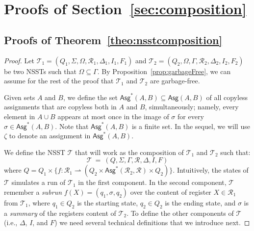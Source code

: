 \documentclass[
a4paper
]{article}
\theoremstyle{plain}
\theoremstyle{definition}
\theoremstyle{remark}
\newcommand{\pmap}{\rightharpoonup}
\newcommand{\Reg}{\mathcal{R}}
\newcommand{\Asg}{\operatorname{Asg}}
\newcommand{\Asgs}{\operatorname{Asg}^*}
\newcommand{\nsst}{\mathcal{T}}
\renewcommand{\operatorname}[1]{\textsf{#1}}
\begin{document}
\section{Proofs of Section~\ref{sec:composition}}\label{sec:compAppendix}
	
\subsection{Proofs of Theorem~\ref{theo:nsstcomposition}}

\begin{proof}
Let $\nsst_1 = (Q_1, \Sigma, \Omega, \Reg_1, \Delta_1, I_1, F_1)$ and $\nsst_2 = (Q_2, \Omega, \Gamma, \Reg_2, \Delta_2, I_2, F_2)$ be two NSSTs such that $\Omega \subseteq \Gamma$. By Proposition~\ref{prop:garbageFree}, we can assume for the rest of the proof that $\nsst_1$ and $\nsst_2$ are garbage-free. 

Given sets $A$ and $B$, we define the set $\Asgs(A, B) \subseteq \Asg(A,B)$ of all copyless assignments that are copyless both in $A$ and $B$, simultaneously; namely, every element in $A \cup B$ appears at most once in the image of $\sigma$ for every $\sigma \in \Asgs(A,B)$. Note that $\Asgs(A, B)$ is a finite set. In the sequel, we will use $\zeta$ to denote an assignment in $\Asgs(A,B)$.

We define the NSST $\nsst$ that will work as the composition of $\nsst_1$ and $\nsst_2$ such that:
\[
\nsst \ = \ (Q, \Sigma, \Gamma, \Reg, \Delta, I, F)
\]
where $Q = Q_1 \times \{f\colon \Reg_1 \pmap (Q_2 \times \Asgs(\Reg_2, \Reg) \times Q_2) \}$. Intuitively, the states of $\nsst$ simulates a run of $\nsst_1$ in the first component. In the second component, $\nsst$ remember a \emph{subrun} $f(X) = (q_1, \sigma, q_2)$ over the content of register $X \in \Reg_1$ from $\nsst_1$, where $q_1 \in Q_2$ is the starting state, $q_2 \in Q_2$ is the ending state, and $\sigma$ is a \emph{summary} of the registers content of $\nsst_2$. To define the other components of $\nsst$ (i.e.,  $\Delta$, $I$, and $F$) we need several technical definitions that we introduce next.


\end{proof}
\end{document}
